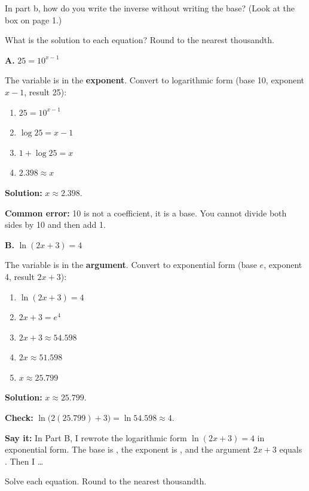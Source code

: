 \vspace{4pt}
In part b, how do you write the inverse without writing the base? (Look at the box on page 1.)\lines[1]

What is the solution to each equation? Round to the nearest thousandth.

\begin{minipage}[t]{0.48\textwidth}
\textbf{A.} $25=10^{x-1}$

The variable is in the \textbf{exponent}. Convert to logarithmic form (base 10, exponent \mbox{$x-1$}, result 25):
\begin{enumerate}[label=\arabic*.]
\item $25=10^{x-1}$
\item $\log25=x-1$
\item $1+\log25=x$
\item $2.398\approx x$
\end{enumerate}
\textbf{Solution:} $x\approx2.398$.

\textbf{Common error:} 10 is not a coefficient, it is a base. You cannot divide both sides by 10 and then add 1.
\end{minipage}\hfill
\begin{minipage}[t]{0.48\textwidth}
\textbf{B.} $\ln(2x+3)=4$

The variable is in the \textbf{argument}. Convert to exponential form (base $e$, exponent 4, result \mbox{$2x+3$}):
\begin{enumerate}[label=\arabic*.]
\item $\ln(2x+3)=4$
\item $2x+3=e^4$
\item $2x+3\approx54.598$
\item $2x\approx51.598$
\item $x\approx25.799$
\end{enumerate}
\textbf{Solution:} $x\approx25.799$.

\textbf{Check:} $\ln\bigl(2(25.799)+3\bigr)=\ln 54.598\approx4$. \checkmark
\end{minipage}

\vspace{4pt}
\textbf{Say it:} In Part B, I rewrote the logarithmic form $\ln(2x+3)=4$ in exponential form. The base is \blank[1.2cm], the exponent is \blank[1.2cm], and the argument $2x+3$ equals \blank[1.5cm]. Then I \dots \lines[2]

\newpage

Solve each equation. Round to the nearest thousandth.

